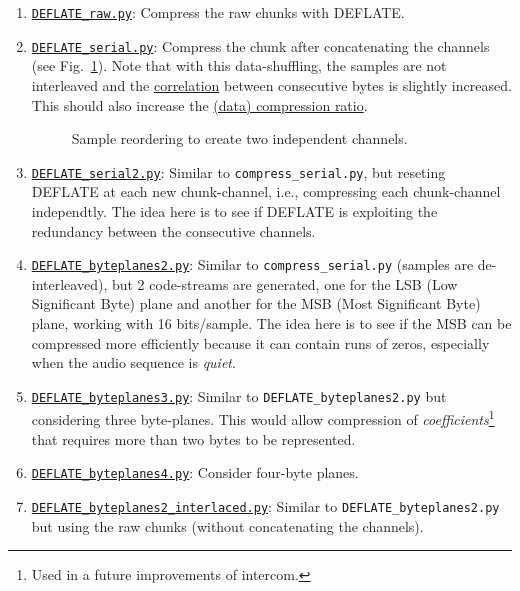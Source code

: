 \begin{enumerate}
\item
  \href{https://github.com/Tecnologias-multimedia/InterCom/blob/master/src/DEFLATE\_raw.py}{\texttt{DEFLATE\_raw.py}}:
  Compress the raw chunks with DEFLATE.
\item
  \href{https://github.com/Tecnologias-multimedia/InterCom/blob/master/src/DEFLATE\_serial.py}{\texttt{DEFLATE\_serial.py}}:
  Compress the chunk after concatenating the channels (see
  Fig.~\ref{fig:reordering}). Note that with this data-shuffling,
  the samples are not interleaved and the
  \href{https://en.wikipedia.org/wiki/Correlation}{correlation}
  between consecutive bytes is slightly increased. This should also
  increase the
  \href{https://en.wikipedia.org/wiki/Data_compression_ratio}{(data)
    compression ratio}.
\begin{figure}
  \begin{center}
  \end{center}
  \caption{Sample reordering to create two independent channels.}
  \label{fig:reordering}
\end{figure}
\item
  \href{https://github.com/Tecnologias-multimedia/InterCom/blob/master/src/DEFLATE\_serial2.py}{\texttt{DEFLATE\_serial2.py}}:
  Similar to \verb|compress_serial.py|, but reseting DEFLATE at each
  new chunk-channel, i.e., compressing each chunk-channel
  independtly. The idea here is to see if DEFLATE is exploiting the
  redundancy between the consecutive channels.
\item
  \href{https://github.com/Tecnologias-multimedia/InterCom/blob/master/src/DEFLATE\_byteplanes2.py}{\texttt{DEFLATE\_byteplanes2.py}}:
  Similar to \verb|compress_serial.py| (samples are de-interleaved),
  but 2 code-streams are generated, one for the LSB (Low Significant
  Byte) plane and another for the MSB (Most Significant Byte) plane,
  working with 16 bits/sample. The idea here is to see if the MSB can
  be compressed more efficiently because it can contain runs of zeros,
  especially when the audio sequence is \emph{quiet}.
\item
  \href{https://github.com/Tecnologias-multimedia/InterCom/blob/master/src/DEFLATE\_byteplanes3.py}{\texttt{DEFLATE\_byteplanes3.py}}:
  Similar to \verb|DEFLATE_byteplanes2.py| but considering three
  byte-planes. This would allow compression of
  \emph{coefficients}\footnote{Used in a future improvements of
  intercom.} that requires more than two bytes to be represented.
\item
  \href{https://github.com/Tecnologias-multimedia/InterCom/blob/master/src/DEFLATE\_byteplanes4.py}{\texttt{DEFLATE\_byteplanes4.py}}:
  Consider four-byte planes.
\item
  \href{https://github.com/Tecnologias-multimedia/InterCom/blob/master/src/DEFLATE_byteplanes2\_interlaced.py}{\texttt{DEFLATE\_byteplanes2\_interlaced.py}}:
  Similar to \verb|DEFLATE_byteplanes2.py| but using the raw chunks
  (without concatenating the channels).
\end{enumerate}

